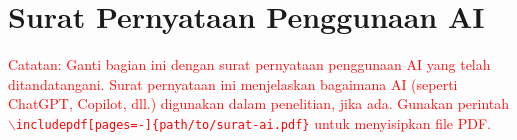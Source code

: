 \section{Surat Pernyataan Penggunaan AI}

% 

\textcolor{red}{Catatan: Ganti bagian ini dengan surat pernyataan penggunaan AI yang telah ditandatangani. Surat pernyataan ini menjelaskan bagaimana AI (seperti ChatGPT, Copilot, dll.) digunakan dalam penelitian, jika ada. Gunakan perintah \texttt{$\backslash$includepdf[pages=-]\{path/to/surat-ai.pdf\}} untuk menyisipkan file PDF.}

